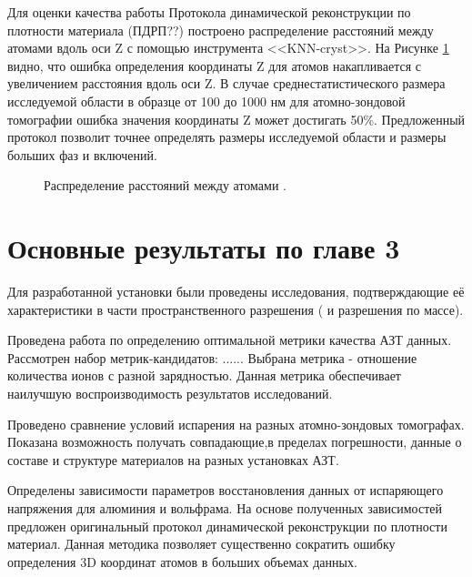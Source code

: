 Для оценки качества работы Протокола динамической реконструкции по плотности материала (ПДРП??) построено распределение расстояний между атомами вдоль оси Z с помощью инструмента <<KNN-cryst>>. На Рисунке \cref{fig:p3_atomiccount_distance} видно, что ошибка определения координаты Z для атомов накапливается с увеличением расстояния вдоль оси Z. В случае среднестатистического размера исследуемой области в 
образце от 100 до 1000 нм для атомно-зондовой томографии ошибка значения координаты Z может достигать 50\%. Предложенный протокол позволит точнее определять размеры исследуемой области и размеры больших фаз и включений.

\begin{figure}[htb]
	\caption{Распределение расстояний между атомами \cite{scbibDensity}.}
	\label{fig:p3_atomiccount_distance}
\end{figure}




\FloatBarrier
\section{Основные результаты по главе 3}\label{sec:ch3/sect6}

Для разработанной установки были проведены исследования, подтверждающие её характеристики в части пространственного разрешения ( и разрешения по массе).

Проведена работа по определению оптимальной метрики качества АЗТ данных. Рассмотрен набор метрик-кандидатов: ...... 
Выбрана метрика  - отношение количества ионов с разной зарядностью. Данная метрика обеспечивает наилучшую воспроизводимость результатов исследований. 

Проведено сравнение условий испарения на разных атомно-зондовых томографах. Показана возможность получать совпадающие,в пределах погрешности, данные о составе и структуре материалов на разных установках АЗТ.

Определены зависимости параметров восстановления данных от испаряющего напряжения для алюминия и вольфрама. На основе полученных зависимостей предложен оригинальный протокол динамической реконструкции по плотности материал. Данная методика позволяет существенно сократить ошибку определения 3D координат атомов в больших объемах данных.










\clearpage
